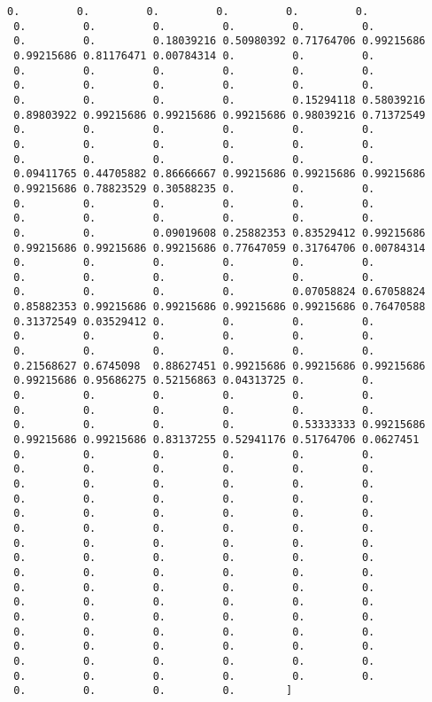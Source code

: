 \documentclass[11pt]{article}
\begin{document}
\begin{Verbatim}[commandchars=\\\{\}]
 0.         0.         0.         0.         0.         0.
 0.         0.         0.         0.         0.         0.
 0.         0.         0.18039216 0.50980392 0.71764706 0.99215686
 0.99215686 0.81176471 0.00784314 0.         0.         0.
 0.         0.         0.         0.         0.         0.
 0.         0.         0.         0.         0.         0.
 0.         0.         0.         0.         0.15294118 0.58039216
 0.89803922 0.99215686 0.99215686 0.99215686 0.98039216 0.71372549
 0.         0.         0.         0.         0.         0.
 0.         0.         0.         0.         0.         0.
 0.         0.         0.         0.         0.         0.
 0.09411765 0.44705882 0.86666667 0.99215686 0.99215686 0.99215686
 0.99215686 0.78823529 0.30588235 0.         0.         0.
 0.         0.         0.         0.         0.         0.
 0.         0.         0.         0.         0.         0.
 0.         0.         0.09019608 0.25882353 0.83529412 0.99215686
 0.99215686 0.99215686 0.99215686 0.77647059 0.31764706 0.00784314
 0.         0.         0.         0.         0.         0.
 0.         0.         0.         0.         0.         0.
 0.         0.         0.         0.         0.07058824 0.67058824
 0.85882353 0.99215686 0.99215686 0.99215686 0.99215686 0.76470588
 0.31372549 0.03529412 0.         0.         0.         0.
 0.         0.         0.         0.         0.         0.
 0.         0.         0.         0.         0.         0.
 0.21568627 0.6745098  0.88627451 0.99215686 0.99215686 0.99215686
 0.99215686 0.95686275 0.52156863 0.04313725 0.         0.
 0.         0.         0.         0.         0.         0.
 0.         0.         0.         0.         0.         0.
 0.         0.         0.         0.         0.53333333 0.99215686
 0.99215686 0.99215686 0.83137255 0.52941176 0.51764706 0.0627451
 0.         0.         0.         0.         0.         0.
 0.         0.         0.         0.         0.         0.
 0.         0.         0.         0.         0.         0.
 0.         0.         0.         0.         0.         0.
 0.         0.         0.         0.         0.         0.
 0.         0.         0.         0.         0.         0.
 0.         0.         0.         0.         0.         0.
 0.         0.         0.         0.         0.         0.
 0.         0.         0.         0.         0.         0.
 0.         0.         0.         0.         0.         0.
 0.         0.         0.         0.         0.         0.
 0.         0.         0.         0.         0.         0.
 0.         0.         0.         0.         0.         0.
 0.         0.         0.         0.         0.         0.
 0.         0.         0.         0.         0.         0.
 0.         0.         0.         0.         0.         0.
 0.         0.         0.         0.        ]

    \end{Verbatim}
\end{document}
